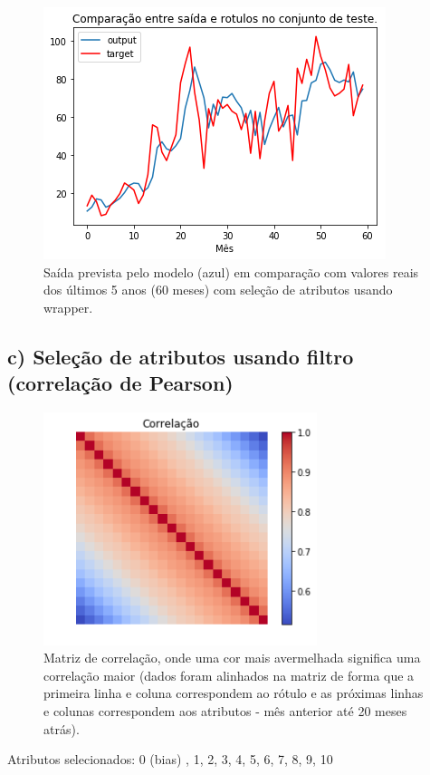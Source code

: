 \documentclass[a4paper, 12pt]{article}
\begin{document}
\begin{figure}[h!]
    \centering
    \includegraphics[width=10cm]{images/wrapper.png}
    \caption{Saída prevista pelo modelo (azul) em comparação com valores reais dos últimos 5 anos (60 meses) com seleção de atributos usando wrapper.}
\end{figure}

\subsection*{c) Seleção de atributos usando filtro (correlação de Pearson)}

\begin{figure}[h!]
    \centering
    \includegraphics[width=8cm]{images/corr.png}
    \caption{Matriz de correlação, onde uma cor mais avermelhada significa uma correlação maior (dados foram alinhados na matriz de forma que a primeira linha e coluna correspondem ao rótulo e as próximas linhas e colunas correspondem aos atributos - mês anterior até 20 meses atrás).}
\end{figure}

Atributos selecionados: 0 (bias) , 1, 2, 3, 4, 5, 6, 7, 8, 9, 10
\end{document}
